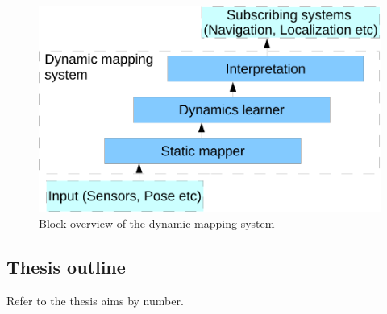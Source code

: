 \begin{figure} [htbp]
	\centering
	\includegraphics[scale=0.7]{chapters/introduction/figures/system-overview}
	\caption{Block overview of the dynamic mapping system}
	\label{fig:block-overview}
\end{figure}

\subsection{Thesis outline}
Refer to the thesis aims by number.



